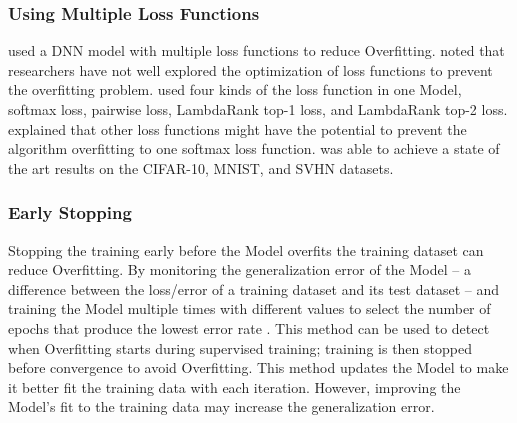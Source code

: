 \documentclass[oneside,12pt,article]{article}
\begin{document}
\subsubsection{Using Multiple Loss Functions}
\cite{xu2015multi} used a DNN model with multiple loss functions to reduce Overfitting. \cite{xu2015multi} noted that researchers have not well explored the optimization of loss functions to prevent the overfitting problem. \cite{xu2015multi} used four kinds of the loss function in one Model, softmax loss, pairwise loss, LambdaRank top-1 loss, and LambdaRank top-2 loss. \cite{xu2015multi} explained that other loss functions might have the potential to prevent the algorithm overfitting to one softmax loss function. \cite{xu2015multi} was able to achieve a state of the art results on the CIFAR-10, MNIST, and SVHN datasets.

\subsubsection{Early Stopping}
Stopping the training early before the Model overfits the training dataset can reduce Overfitting. By monitoring the generalization error of the Model – a difference between the loss/error of a training dataset and its test dataset \cite{jakubovitz2019generalization} – and training the Model multiple times with different values to select the number of epochs that produce the lowest error rate \cite{prechelt1998early}. This method can be used to detect when Overfitting starts during supervised training; training is then stopped before convergence to avoid Overfitting. This method updates the Model to make it better fit the training data with each iteration. However, improving the Model's fit to the training data may increase the generalization error. 
\end{document}
